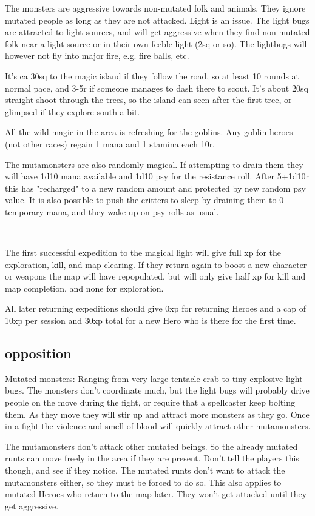 The monsters are aggressive towards non-mutated folk and animals. They ignore mutated people as long as they are not attacked.
Light is an issue. The light bugs are attracted to light sources, and will get aggressive when they find non-mutated folk near a light source or in their own feeble light (2sq or so). The lightbugs will however not fly into major fire, e.g. fire balls, etc.

It's ca 30sq to the magic island if they follow the road, so at least 10 rounds at normal pace, and 3-5r if someone manages to dash there to scout. It's about 20sq straight shoot through the trees, so the island can seen after the first tree, or glimpsed if they explore south a bit.

All the wild magic in the area is refreshing for the goblins. Any goblin heroes (not other races) regain 1 mana and 1 stamina each 10r.

The mutamonsters are also randomly magical. If attempting to drain them they will have 1d10 mana available and 1d10 psy for the resistance roll. After 5+1d10r this has "recharged" to a new random amount and protected by new random psy value. It is also possible to push the critters to sleep by draining them  to 0 temporary mana, and they wake up on psy rolls as usual.

\

The first successful expedition to the magical light will give full xp for the exploration, kill, and map clearing. If they return again to boost a new character or weapons the map will have repopulated, but will only give half xp for kill and map completion, and none for exploration.

All later returning expeditions should give 0xp for returning Heroes and a cap of 10xp per session and 30xp total for a new Hero who is there for the first time.


\subsection*{opposition}

Mutated monsters: Ranging from very large tentacle crab to tiny explosive light bugs. The monsters don't coordinate much, but the light bugs will probably drive people on the move during the fight, or require that a spellcaster keep bolting them. As they move they will stir up and attract more monsters as they go. Once in a fight the violence and smell of blood will quickly attract other mutamonsters.

The mutamonsters don't attack other mutated beings. So the already mutated runts can move freely in the area if they are present. Don't tell the players this though, and see if they notice. The mutated runts don't want to attack the mutamonsters either, so they must be forced to do so. This also applies to mutated Heroes who return to the map later. They won't get attacked until they get aggressive.

